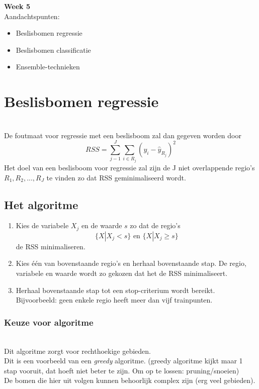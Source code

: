 {\large
\textbf{{\LARGE Week 5}}\\
Aandachtspunten:
\begin{itemize}
    \item Beslisbomen regressie
    \item Beslisbomen classificatie
    \item Ensemble-technieken
\end{itemize}

\section{Beslisbomen regressie}\\
De foutmaat voor regressie met een beslisboom zal dan
gegeven worden door
\[RSS=\sum\limits_{j-1}^J\sum\limits_{i\in R_j}(y_i-\hat{y}_{R_j})^2\]
Het doel van een beslisboom voor regressie zal zijn de J niet
overlappende regio’s $R_1, R_2,... , R_J$ te vinden zo dat RSS
geminimaliseerd wordt.

\subsection{Het algoritme}
\begin{enumerate}
    \item Kies de variabele $X_j$ en de waarde $s$ zo dat de regio's 
    \[\{X|X_j<s\} \textrm{ en } \{X|X_j\geq s\}\]
    de RSS minimaliseren.
    \item Kies één van bovenstaande regio’s en herhaal
bovenstaande stap. De regio, variabele en waarde wordt
zo gekozen dat het de RSS minimaliseert.
    \item Herhaal bovenstaande stap tot een stop-criterium wordt
bereikt. Bijvoorbeeld: geen enkele regio heeft meer dan
vijf trainpunten.
\end{enumerate}

\subsubsection{Keuze voor algoritme}\\
\noindent Dit algoritme zorgt voor rechthoekige gebieden.\\

\noindent Dit is een voorbeeld van een \textit{greedy} algoritme. (greedy algoritme kijkt maar 1 stap vooruit, dat hoeft niet beter te zijn. Om op te lossen: pruning/snoeien)\\

\noindent De bomen die hier uit volgen kunnen behoorlijk complex zijn
(erg veel gebieden).\\

}
